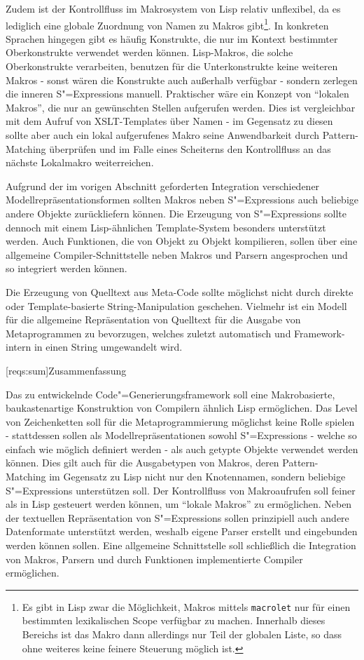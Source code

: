 \documentclass[11pt, a4paper, bibgerm]{scrbook}
\newcommand\icode[1]{\lstinline?#1?}
\newcommand\lsection{}
\newcommand{\sexps}{S"=Expressions}
\newcommand{\cgen}{Code"=Generierung}
\begin{document}
Zudem ist der Kontrollfluss im Makrosystem von Lisp relativ unflexibel,
da es lediglich eine globale Zuordnung von Namen zu Makros
gibt\footnote{Es gibt in Lisp zwar die Möglichkeit, Makros mittels
  \icode{macrolet} nur für einen bestimmten lexikalischen Scope
  verfügbar zu machen. Innerhalb dieses Bereichs ist das Makro dann
  allerdings nur Teil der globalen Liste, so dass ohne weiteres keine
  feinere Steuerung möglich ist.}. In konkreten Sprachen hingegen gibt
es häufig Konstrukte, die nur im Kontext bestimmter Oberkonstrukte
verwendet werden können. Lisp-Makros, die solche Oberkonstrukte
verarbeiten, benutzen für die Unterkonstrukte keine weiteren Makros -
sonst wären die Konstrukte auch außerhalb verfügbar - sondern zerlegen
die inneren \sexps{} manuell. Praktischer wäre ein Konzept von "`lokalen
Makros"', die nur an gewünschten Stellen aufgerufen werden. Dies ist
vergleichbar mit dem Aufruf von XSLT-Templates über Namen - im Gegensatz
zu diesen sollte aber auch ein lokal aufgerufenes Makro seine
Anwendbarkeit durch Pattern-Matching überprüfen und im Falle eines
Scheiterns den Kontrollfluss an das nächste Lokalmakro weiterreichen.

Aufgrund der im vorigen Abschnitt geforderten Integration verschiedener
Modellrepräsentationsformen sollten Makros neben \sexps{} auch beliebige
andere Objekte zurückliefern können. Die Erzeugung von \sexps{} sollte
dennoch mit einem Lisp-ähnlichen Template-System besonders unterstützt
werden. Auch Funktionen, die von Objekt zu Objekt kompilieren, sollen
über eine allgemeine Compiler-Schnittstelle neben Makros und Parsern
angesprochen und so integriert werden können.

Die Erzeugung von Quelltext aus Meta-Code sollte möglichst nicht durch
direkte oder Template-basierte String-Manipulation geschehen. Vielmehr
ist ein Modell für die allgemeine Repräsentation von Quelltext für die
Ausgabe von Metaprogrammen zu bevorzugen, welches zuletzt automatisch
und Framework-intern in einen String umgewandelt wird.

\lsection[reqs:sum]{Zusammenfassung}

Das zu entwickelnde \cgen{}sframework soll eine Makrobasierte,
baukastenartige Konstruktion von Compilern ähnlich Lisp ermöglichen. Das
Level von Zeichenketten soll für die Metaprogrammierung möglichst keine
Rolle spielen - stattdessen sollen als Modellrepräsentationen sowohl
\sexps{} - welche so einfach wie möglich definiert werden - als auch
getypte Objekte verwendet werden können. Dies gilt auch für die
Ausgabetypen von Makros, deren Pattern-Matching im Gegensatz zu Lisp
nicht nur den Knotennamen, sondern beliebige \sexps{} unterstützen
soll. Der Kontrollfluss von Makroaufrufen soll feiner als in Lisp
gesteuert werden können, um "`lokale Makros"' zu ermöglichen. Neben der
textuellen Repräsentation von \sexps{} sollen prinzipiell auch andere
Datenformate unterstützt werden, weshalb eigene Parser erstellt und
eingebunden werden können sollen. Eine allgemeine Schnittstelle soll
schließlich die Integration von Makros, Parsern und durch Funktionen
implementierte Compiler ermöglichen.
\end{document}
